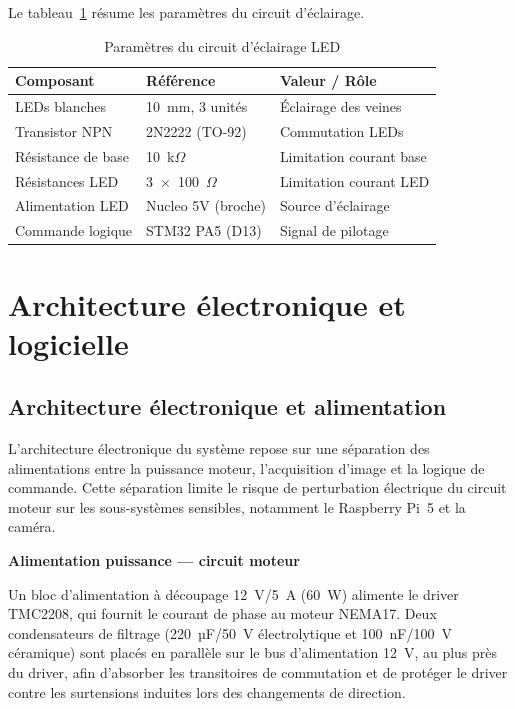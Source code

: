 Le tableau~\ref{tab:circuit_led} résume les paramètres du circuit d'éclairage.

\begin{table}[htbp]
\caption{Paramètres du circuit d'éclairage LED}
\label{tab:circuit_led}
\centering
\small
\renewcommand{\arraystretch}{1.4}
\begin{tabular}{|l|l|l|}
\hline
\rowcolor{navyblue}
\textbf{\color{white}Composant} & \textbf{\color{white}Référence} & \textbf{\color{white}Valeur / Rôle} \\
\hline
LEDs blanches & 10~mm, 3 unités & Éclairage des veines \\
\hline
Transistor NPN & 2N2222 (TO-92) & Commutation LEDs \\
\hline
Résistance de base & 10~k$\Omega$ & Limitation courant base \\
\hline
Résistances LED & 3~$\times$~100~$\Omega$ & Limitation courant LED \\
\hline
Alimentation LED & Nucleo 5V (broche) & Source d'éclairage \\
\hline
Commande logique & STM32 PA5 (D13) & Signal de pilotage \\
\hline
\end{tabular}
\end{table}

\section{Architecture électronique et logicielle}
\label{sec:archi_elec_log}

\subsection{Architecture électronique et alimentation}

L'architecture électronique du système repose sur une séparation des alimentations entre
la puissance moteur, l'acquisition d'image et la logique de commande. Cette séparation limite
le risque de perturbation électrique du circuit moteur sur les sous-systèmes sensibles,
notamment le Raspberry Pi~5 et la caméra.

\medskip
\noindent\textbf{Alimentation puissance — circuit moteur}

Un bloc d'alimentation à découpage 12~V/5~A (60~W) alimente le driver TMC2208, qui fournit
le courant de phase au moteur NEMA17. Deux condensateurs de filtrage (220~µF/50~V électrolytique
et 100~nF/100~V céramique) sont placés en parallèle sur le bus d'alimentation 12~V, au plus
près du driver, afin d'absorber les transitoires de commutation et de protéger le driver
contre les surtensions induites lors des changements de direction.

